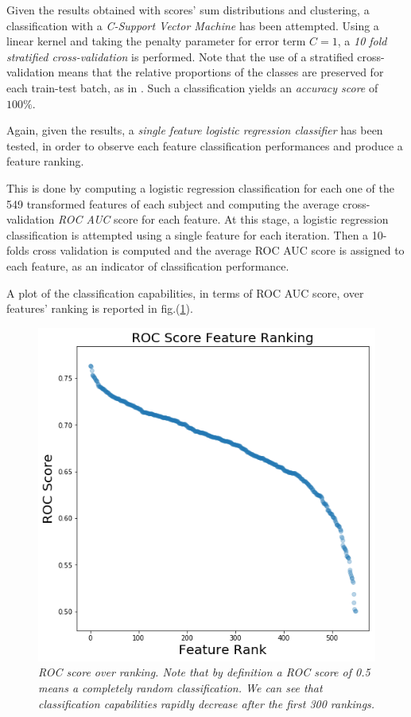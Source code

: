 \documentclass[12pt,openright,twoside,a4paper]{book}
\begin{document}
Given the results obtained with scores' sum distributions and clustering, a classification with a \textit{C-Support Vector Machine} has been attempted. 
Using a linear kernel and taking the penalty parameter for error term $C=1$, a \textit{10 fold stratified cross-validation} is performed.
Note that the use of  a stratified cross-validation means that the relative proportions of the classes are preserved for each train-test batch, as in \cite{ESL}.
Such a classification yields  an\textit{ accuracy score} of $100\%$.

Again, given the results, a \textit{single feature logistic regression classifier} has been tested, in order to observe each feature classification performances and produce a feature ranking.

This is done by computing a logistic regression classification for each one of the 549 transformed features of each subject and computing the average cross-validation \textit{ROC AUC} score for each feature.
At this stage, a logistic regression classification is attempted using a single feature for each iteration.
Then a 10-folds cross validation is computed and the average ROC AUC score is assigned to each feature, as an indicator of classification performance.

A plot of the  classification capabilities, in terms of ROC AUC score, over features' ranking is reported in fig.(\ref{ADNI-frank}). 

\begin{figure}[!h]
\centering
\includegraphics[scale=0.5]{ROC-feature-rank}
\caption{\textit{ROC score over ranking. Note that by definition a ROC score of 0.5 means a completely random classification. We can see that classification capabilities rapidly decrease after the first 300 rankings.}}
\label{ADNI-frank}
\end{figure}
\end{document}
